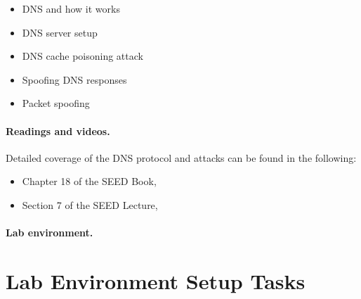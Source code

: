 \begin{itemize}[noitemsep]
\item DNS and how it works
\item DNS server setup
\item DNS cache poisoning attack
\item Spoofing DNS responses
\item Packet spoofing
\end{itemize}


\paragraph{Readings and videos.}
Detailed coverage of the DNS protocol and attacks can be found in the following:

\begin{itemize}
\item Chapter 18 of the SEED Book, \seedbook
\item Section 7 of the SEED Lecture, \seedisvideo
\end{itemize}


\paragraph{Lab environment.} \seedenvironmentB


\begin{comment}
\vspace{0.2in}
\noindent
\fbox{\parbox{\textwidth}{
\noindent
\textbf{Customization.}
In this lab description, we use the domain \texttt{attacker32.com} to refer to the
domain controlled by the attacker. When students do this lab, they are not allowed
to use this name; instead, they should use a domain name that includes their last names.
The objective of this requirement is to differentiate student's work. Since 
the domain name is only visible inside the lab environment, not to the
public, any name, including those already owned by others, can be used
safely in this lab. 
}}
\end{comment}




\section{Lab Environment Setup Tasks}
\label{sec:environment}

